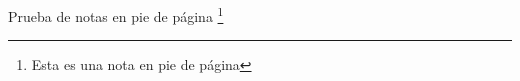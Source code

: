\documentclass{article}
\begin{document}
Prueba de notas en pie de página \footnote{Esta es una nota en pie de página}
\end{document}
